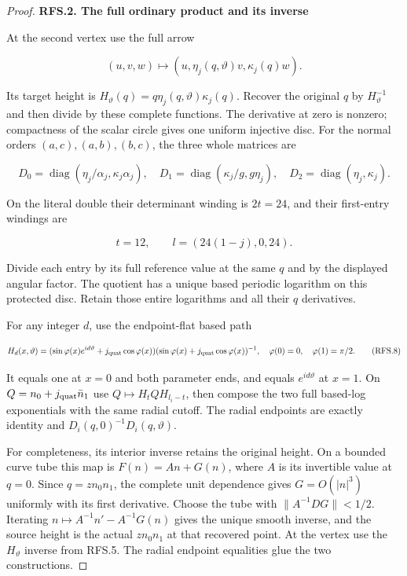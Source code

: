 \begin{proof}
\par

\medskip\noindent\textbf{RFS.2. The full ordinary product and its inverse}

\par\nobreak

At the second vertex use the full arrow

\[
          (u,v,w)\longmapsto(u,\eta_j(q,\vartheta)v,
                                      \kappa_j(q)w).
 \tag{RFS.5}
\]

Its target height is \(H_\vartheta(q)=q\eta_j(q,\vartheta)\kappa_j(q)\).
Recover the original \(q\) by \(H_\vartheta^{-1}\) and then divide
by these complete functions. The derivative at zero is nonzero;
compactness of the scalar circle gives one uniform injective disc.
For the normal orders \((a,c),(a,b),(b,c)\), the three whole
matrices are

\[
 D_0=\operatorname{diag}(\eta_j/\alpha_j,\kappa_j\alpha_j),\quad
 D_1=\operatorname{diag}(\kappa_j/g,g\eta_j),\quad
 D_2=\operatorname{diag}(\eta_j,\kappa_j).
 \tag{RFS.6}
\]

On the literal double their determinant winding is \(2t=24\),
and their first-entry windings are

\[
              t=12,\qquad l=(24(1-j),0,24).
 \tag{RFS.7}
\]

Divide each entry by its full reference value at the same \(q\)
and by the displayed angular factor. The quotient has a unique
based periodic logarithm on this protected disc. Retain those
entire logarithms and all their \(q\) derivatives.

For any integer \(d\), use the endpoint-flat based path

\[
 H_d(x,\vartheta)=
 (\sin\varphi(x)e^{id\vartheta}+j_{\rm quat}\cos\varphi(x))
 (\sin\varphi(x)+j_{\rm quat}\cos\varphi(x))^{-1},
 \quad\varphi(0)=0,\quad\varphi(1)=\pi/2.
 \tag{RFS.8}
\]

It equals one at \(x=0\) and both parameter ends, and equals
\(e^{id\vartheta}\) at \(x=1\). On
\(Q=n_0+j_{\rm quat}\bar n_1\) use
\(Q\mapsto H_tQH_{l_i-t}\), then compose the two full based-log
exponentials with the same radial cutoff. The radial endpoints
are exactly identity and \(D_i(q,0)^{-1}D_i(q,\vartheta)\).

For completeness, its interior inverse retains the original height.
On a bounded curve tube this map is \(F(n)=A n+G(n)\), where
\(A\) is its invertible value at \(q=0\). Since \(q=zn_0n_1\),
the complete unit dependence gives \(G=O(|n|^3)\) uniformly with
its first derivative. Choose the tube with
\(\|A^{-1}DG\|<1/2\). Iterating
\(n\mapsto A^{-1}n'-A^{-1}G(n)\) gives the unique smooth inverse,
and the source height is the actual \(zn_0n_1\) at that recovered
point. At the vertex use the \(H_\vartheta\) inverse from RFS.5.
The radial endpoint equalities glue the two constructions.


\end{proof}
